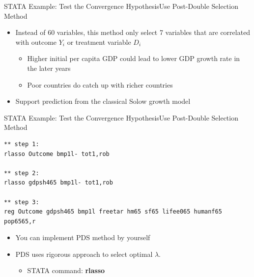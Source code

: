 \documentclass[hyperref={pdfpagelabels=false}]{beamer}
\begin{document}
\begin{frame}[fragile]{STATA Example: Test the Convergence Hypothesis}{Use Post-Double Selection Method}
		
	
	\begin{itemize}	
		\vspace{0.2cm}
		\normalsize
		\item Instead of 60 variables, this method only select 7 variables that are correlated with outcome $Y_{i}$ or treatment variable $D_{i}$
		\vspace{0.2cm}
			\begin{itemize}	
				\item Higher initial per capita GDP could lead to lower GDP growth rate in the later years
		\vspace{0.2cm}
		\item Poor countries do catch up with richer countries
				\vspace{0.2cm}
					\end{itemize}
	    \item Support prediction from the classical Solow growth model

	\end{itemize}
	
	
\end{frame}



\begin{frame}[fragile]{STATA Example: Test the Convergence Hypothesis}{Use Post-Double Selection Method}
\begin{lstlisting}
** step 1: 
rlasso Outcome bmp1l- tot1,rob

** step 2: 
rlasso gdpsh465 bmp1l- tot1,rob

** step 3:
reg Outcome gdpsh465 bmp1l freetar hm65 sf65 lifee065 humanf65 pop6565,r

\end{lstlisting}
	
	\begin{itemize}	
	\item You can implement PDS method by yourself
		\vspace{0.2cm}
	\item PDS uses rigorous approach to select optimal $\lambda$.
	\vspace{0.2cm}
	\begin{itemize}
		\item STATA command: \textbf{rlasso}
	\end{itemize}


	\end{itemize}
	
	
\end{frame}
\end{document}
